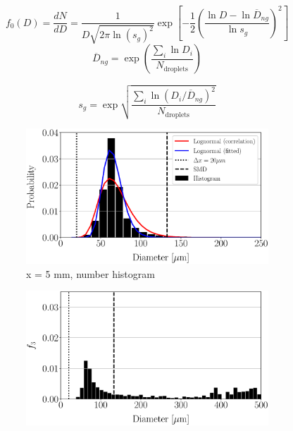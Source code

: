 \begin{equation}
 f_0 \left( D \right) = \frac{d N}{d D} =  \frac{1}{D  \sqrt{2 \pi \ln \left( s_g \right)^2}} \exp \left[ - \frac{1}{2 } \left( \frac{\ln D - \ln \overline{D}_{ng}}{\ln s_g}   \right)^2 \right]
\end{equation}
%
\begin{equation}
\overline{D}_{ng} = \exp \left(  \frac{\sum_i \ln D_i }{N_\mathrm{droplets}} \right) 
\end{equation}

\begin{equation}
s_g = \exp \sqrt{  \frac{\sum_i \ln \left( D_i / \overline{D}_{ng} \right) ^2 }{N_\mathrm{droplets}} }
\end{equation}




\begin{figure}[ht]
\centering
\begin{subfigure}[b]{0.45\textwidth}
	\centering
   \includegraphics[scale=0.30]{./part2_developments/figures_ch5_resolved_JICF/spray_distributions/uG100_dx20_x05_number_histogram.eps}
   \caption{x = 5 mm, number histogram}
\end{subfigure}
\hfill
\begin{subfigure}[b]{0.45\textwidth}
	\centering
   \includegraphics[scale=0.30]{./part2_developments/figures_ch5_resolved_JICF/spray_distributions/uG100_dx20_x05_volume_histogram.eps}

\end{subfigure}
\end{figure}
